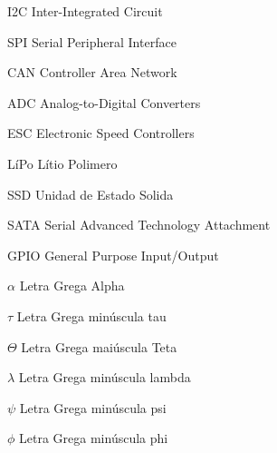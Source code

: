 \documentclass[
	12pt,					%
	openright,				%
	oneside,					%
	a4paper,					%
	english,					%
	brazil					%
	]{abntex2}
\begin{document}
\begin{siglas}
  \item [I2C] Inter-Integrated Circuit
  \item [SPI] Serial Peripheral Interface
  \item [CAN] Controller Area Network
  \item [ADC] Analog-to-Digital Converters
  \item [ESC] Electronic Speed Controllers
  \item [LíPo] Lítio Polimero
  \item [SSD] Unidad de Estado Solida
  \item [SATA] Serial Advanced Technology Attachment 
  \item [GPIO] General Purpose Input/Output
\end{siglas}

\begin{simbolos}
  	\item[$ \alpha $] Letra Grega Alpha
  	\item[$ \tau $] Letra Grega minúscula tau 
  	\item[$ \Theta $] Letra Grega maiúscula Teta
	\item[$ \lambda $] Letra Grega minúscula lambda
	\item[$ \psi $] Letra Grega minúscula psi
	\item[$ \phi $] Letra Grega minúscula phi 
\end{simbolos}

\tableofcontents*
\cleardoublepage

\textual
\setcounter{page}{1}








\end{document}
